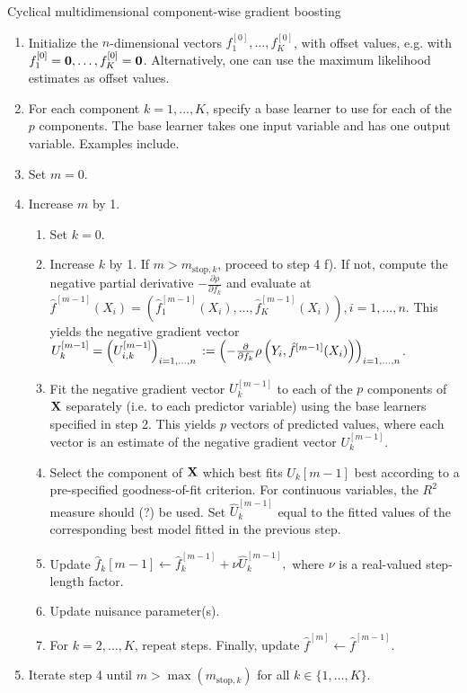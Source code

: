 \begin{algorithm}
\caption{Cyclical multidimensional component-wise gradient boosting}
\label{algo:multidim-boost}
\begin{enumerate}
    \item Initialize the $n$-dimensional vectors $f_1^{[0]},\ldots,f_K^{[0]}$, with offset values, e.g. with $f_1^{[0]}=\mathbf{0},\ldots,f_K^{[0]}=\mathbf{0}$. Alternatively, one can use the maximum likelihood estimates as offset values.
    \item For each component $k=1,\ldots,K$, specify a base learner to use for each of the $p$ components. The base learner takes one input variable and has one output variable. Examples include.
    \item Set $m=0$.
    \item Increase $m$ by 1.
    \begin{enumerate}
        \item Set $k=0$.
        \item Increase $k$ by 1. If $m>m_{\text{stop},k}$, proceed to step 4 f). If not, compute the negative partial derivative $-\frac{\partial\rho}{\partial f_k}$ and evaluate at $\hat{f}^{[m-1]}(X_i)=\left(\hat{f}_1^{[m-1]}(X_i),\ldots,\hat{f}_K^{[m-1]}(X_i)\right),i=1,\ldots,n$. This yields the negative gradient vector $U_k^{[m-1]}=\left(U_{i,k}^{[m-1]}\right)_{i=1,\ldots,n}
        \newline:=\left(-\frac{\partial}{\partial f_k}\rho\left(Y_i,\hat{f}^{[m-1]}(X_i)\right)\right)_{i=1,\ldots,n}$.
        \item Fit the negative gradient vector $U_k^{[m-1]}$ to each of the $p$ components of $\mathbf{X}$ separately (i.e. to each predictor variable) using the base learners specified in step 2. This yields $p$ vectors of predicted values, where each vector is an estimate of the negative gradient vector $U_k^{[m-1]}$.
        \item Select the component of $\mathbf{X}$ which best fits $U_k{[m-1]}$ best according to a pre-specified goodness-of-fit criterion. For continuous variables, the $R^2$ measure should (?) be used. Set $\hat{U}_k^{[m-1]}$ equal to the fitted values of the corresponding best model fitted in the previous step.
        \item Update $\hat{f}_k{[m-1]}\gets\hat{f}_k^{[m-1]}+\nu\hat{U}_k^{[m-1]},$ where $\nu$ is a real-valued step-length factor.
        \item Update nuisance parameter(s).
        \item For $k=2,\ldots,K$, repeat steps. Finally, update $\hat{f}^{[m]}\gets\hat{f}^{[m-1]}$.
    \end{enumerate}
    \item Iterate step 4 until $m>\max(m_{\text{stop},k})$ for all $k\in\{1,\ldots,K\}$.
\end{enumerate}
\end{algorithm}
